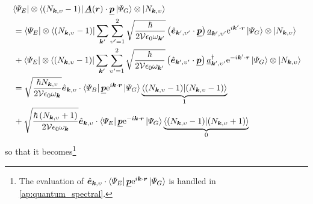 \begin{align} 
\begin{split}\label{eq:Fock_operations}
 &\bra{\Psi_E} \otimes \bra{\left( N_{\mathbold{k},\upsilon} -1 \right)} \underline{\mathbold{A}} ( \mathbold{r} ) \cdot \underline{\mathbold{p}} \ket{\Psi_G} \otimes \ket{N_{\mathbold{k},\upsilon}} \\
 &\: = \bra{\Psi_E} \otimes \bra{\left( N_{\mathbold{k},\upsilon} -1 \right)} \sum_{\mathbold{k}'} \sum_{\upsilon' = 1}^2 \sqrt{\frac{\hbar}{2 \mathcal{V} \epsilon_0 \omega_{\mathbold{k}'}}} \left( \hat{\mathbold{e}}_{\mathbold{k}',\upsilon'} \cdot \underline{\mathbold{p}} \right) \underline{a}_{\mathbold{k}',\upsilon'} \mathrm{e}^{i \mathbold{k}' \cdot \mathbold{r} } \ket{\Psi_G} \otimes \ket{N_{\mathbold{k},\upsilon}} \\
 &\; + \bra{\Psi_E} \otimes \bra{\left( N_{\mathbold{k},\upsilon} -1 \right)} \sum_{\mathbold{k}'} \sum_{\upsilon' = 1}^2 \sqrt{\frac{\hbar}{2 \mathcal{V} \epsilon_0 \omega_{\mathbold{k}'}}} \left( \hat{\mathbold{e}}_{\mathbold{k}',\upsilon'} \cdot \underline{\mathbold{p}} \right) \underline{a}^{\dagger}_{\mathbold{k}',\upsilon'} \mathrm{e}^{-i \mathbold{k}' \cdot \mathbold{r} } \ket{\Psi_G} \otimes \ket{N_{\mathbold{k},\upsilon}} \\
 &\: = \sqrt{\frac{\hbar N_{\mathbold{k},\upsilon}}{2 \mathcal{V} \epsilon_0 \omega_{\mathbold{k}}}} \hat{\mathbold{e}}_{\mathbold{k},\upsilon} \cdot \bra{\Psi_B} \underline{\mathbold{p}} \mathrm{e}^{i \mathbold{k} \cdot \mathbold{r} } \ket{\Psi_G} \underbrace{\braket{\left( N_{\mathbold{k},\upsilon} - 1 \right)}}_{1} \\
 &\; + \sqrt{\frac{\hbar \left( N_{\mathbold{k},\upsilon} + 1 \right)}{2 \mathcal{V} \epsilon_0 \omega_{\mathbold{k}}}} \hat{\mathbold{e}}_{\mathbold{k},\upsilon} \cdot \bra{\Psi_E} \underline{\mathbold{p}} \mathrm{e}^{-i \mathbold{k} \cdot \mathbold{r} } \ket{\Psi_G} \underbrace{\braket{\left( N_{\mathbold{k},\upsilon} - 1 \right)}{\left( N_{\mathbold{k},\upsilon} + 1 \right)}}_{0}
 \end{split}
 \end{align}
so that it becomes\footnote{The evaluation of $\hat{\mathbold{e}}_{\mathbold{k},\upsilon} \cdot \bra{\Psi_E} \underline{\mathbold{p}} \mathrm{e}^{ i \mathbold{k} \cdot \mathbold{r}} \ket{\Psi_G}$ is handled in \cref{ap:quantum_spectral}. }
